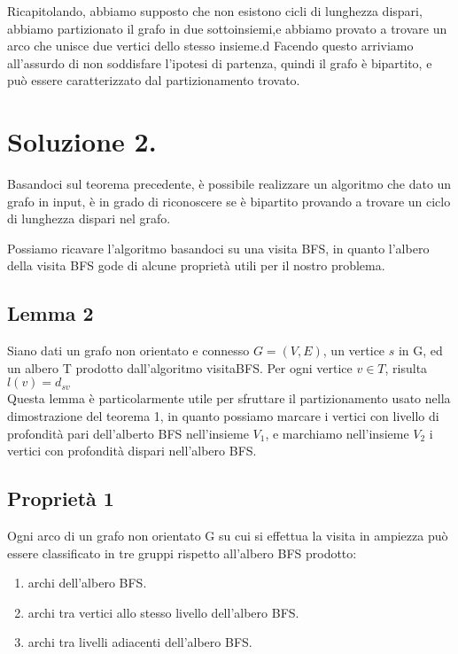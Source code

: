 \documentclass{article}
\begin{document}
Ricapitolando, abbiamo supposto che non esistono cicli di lunghezza dispari,
abbiamo partizionato il grafo in due sottoinsiemi,e abbiamo provato
a trovare un arco che unisce due vertici dello stesso insieme.d
Facendo questo arriviamo all'assurdo di non soddisfare l'ipotesi di partenza, quindi
il grafo è bipartito, e può essere caratterizzato dal partizionamento trovato.

\section*{Soluzione 2.} 

Basandoci sul teorema precedente, è possibile realizzare un algoritmo che dato un 
grafo in input, è in grado di riconoscere se è bipartito provando a trovare 
un ciclo di lunghezza dispari nel grafo.

Possiamo ricavare l'algoritmo basandoci su una visita BFS, in quanto l'albero 
della visita BFS gode di alcune proprietà utili per il nostro problema.

\subsection*{Lemma 2}
Siano dati un grafo non orientato e connesso $G=(V,E)$, un vertice $s$ in G, ed 
un albero T prodotto dall'algoritmo visitaBFS. Per ogni vertice $v \in T$, risulta 
$l(v)=d_{sv}$ 
\\

Questa lemma è particolarmente utile per sfruttare il partizionamento usato nella 
dimostrazione del teorema 1, in quanto possiamo marcare i vertici con livello di 
profondità pari dell'alberto BFS nell'insieme $V_{1}$, e marchiamo nell'insieme 
$V_{2}$ i vertici con profondità dispari nell'albero BFS. 

\subsection*{Proprietà 1}
Ogni arco di un grafo non orientato G su cui si effettua la visita in ampiezza 
può essere classificato in tre gruppi rispetto all'albero BFS prodotto:

\begin{enumerate}
  \item archi dell'albero BFS.
  \item archi tra vertici allo stesso livello dell'albero BFS.
  \item archi tra livelli adiacenti dell'albero BFS.
\end{enumerate}
\end{document}
